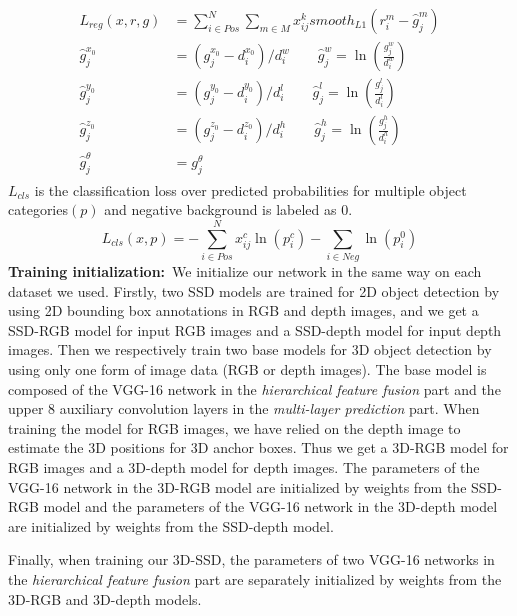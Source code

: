 \documentclass[10pt,twocolumn,letterpaper]{article}
\begin{document}
	\begin{gather}
	\begin{split}
	L_{reg}(x,r,g) &=\sum_{i\in Pos}^{N}\sum_{m\in M} x_{ij}^{k} smooth_{L1}(r_{i}^{m} - \hat{g}_{j}^{m}) \\
	\hat{g}_{j}^{x_{0}} &=(g_{j}^{x_{0}} - d_{i}^{x_{0}})/d_{i}^{w} \qquad \hat{g}_{j}^{w} =\ln(\frac{g_{j}^{w}}{d_{i}^{w}})\\
	\hat{g}_{j}^{y_{0}} &=(g_{j}^{y_{0}} - d_{i}^{y_{0}})/d_{i}^{l} \qquad \hat{g}_{j}^{l} =\ln(\frac{g_{j}^{l}}{d_{i}^{l }})\\
	\hat{g}_{j}^{z_{0}} &=(g_{j}^{z_{0}} - d_{i}^{z_{0}})/d_{i}^{h} \qquad \hat{g}_{j}^{h} =\ln(\frac{g_{j}^{h}}{d_{i}^{h}})\\
	\hat{g}_{j}^{\theta} &=g_{j}^{\theta} \qquad
	\end{split}
	\end{gather}
	$L_{cls}$ is the classification loss over predicted probabilities for multiple object categories$(p)$ and negative background is labeled as $0$.
	\vspace{-3mm}
	\begin{equation}
	L_{cls}(x,p)=-\sum_{i\in Pos}^{N} x_{ij}^{c} \ln(p_{i}^{c}) - \sum_{i\in Neg} \ln(p_{i}^{0})
	\end{equation} 	
	\noindent\textbf{Training initialization:}\ We initialize our network in the same way on each dataset we used. Firstly, two SSD models are trained for 2D object detection by using 2D bounding box annotations in RGB and depth images, and we get a SSD-RGB model for input RGB images and a SSD-depth model for input depth images. Then we respectively train two base models for 3D object detection by using only one form of image data (RGB or depth images). The base model is composed of the VGG-16 network in the \emph{hierarchical feature fusion} part and the upper 8 auxiliary convolution layers in the \emph{multi-layer prediction} part. When training the model for RGB images,  we have relied on the depth image to estimate the 3D positions for 3D anchor boxes. Thus we get a 3D-RGB model for RGB images and a 3D-depth model for depth images. The parameters of the VGG-16 network in the 3D-RGB model are initialized by weights from the SSD-RGB model and the parameters of the  VGG-16 network in the 3D-depth model are initialized by weights from the SSD-depth model.\par
	Finally, when training our 3D-SSD, the parameters of two VGG-16 networks in the \emph{hierarchical feature fusion} part are separately initialized by weights from the 3D-RGB and 3D-depth models. \par
\end{document}
